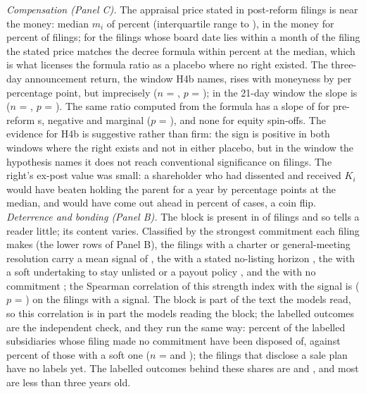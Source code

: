 \emph{Compensation (Panel C).} The appraisal price stated in post-reform filings is near the money: median $m_i$ of \MoneynessMedian{} percent (interquartile range \MoneynessQOne{} to \MoneynessQThree{}), in the money for \MoneynessITM{} percent of filings; for the \AppraisalProxyN{} filings whose board date lies within a month of the filing the stated price matches the decree formula within \AppraisalProxyDiff{} percent at the median, which is what licenses the formula ratio as a placebo where no right existed. The three-day announcement return, the window H4b names, rises with moneyness by \PutSlopeThree{} per percentage point, but imprecisely ($n$ = \PutSlopeThreeN{}, $p$ = \PutSlopeThreeP{}); in the 21-day window the slope is \PutSlopeTwentyOne{} ($n$ = \PutSlopeTwentyOneN{}, $p$ = \PutSlopeTwentyOneP{}). The same ratio computed from the formula has a slope of \PutPlaceboPre{} for pre-reform \captive{}s, negative and marginal ($p$ = \PutPlaceboPreP{}), and none for equity spin-offs. The evidence for H4b is suggestive rather than firm: the sign is positive in both windows where the right exists and not in either placebo, but in the window the hypothesis names it does not reach conventional significance on \PutSlopeThreeN{} filings. The right's ex-post value was small: a shareholder who had dissented and received $K_i$ would have beaten holding the parent for a year by \ExerciseMinusHold{} percentage points at the median, and would have come out ahead in \ExerciseBeats{} percent of cases, a coin flip. \emph{Deterrence and bonding (Panel B).} The block is present in \ProtPostWithBlock{} of \ProtPostN{} filings and so tells a reader little; its content varies. Classified by the strongest commitment each filing makes (the lower rows of Panel B), the \ProtStrengthNThree{} filings with a charter or general-meeting resolution carry a mean signal of \ProtStrengthMeanSThree{}, the \ProtStrengthNTwo{} with a stated no-listing horizon \ProtStrengthMeanSTwo{}, the \ProtStrengthNOne{} with a soft undertaking to stay unlisted or a payout policy \ProtStrengthMeanSOne{}, and the \ProtStrengthNZero{} with no commitment \ProtStrengthMeanSZero{}; the Spearman correlation of this strength index with the signal is \ProtStrengthRho{} ($p$ = \ProtStrengthP{}) on the \ProtStrengthN{} filings with a signal. The block is part of the text the models read, so this correlation is in part the models reading the block; the labelled outcomes are the independent check, and they run the same way: \ProtDisposedStrengthZero{} percent of the labelled subsidiaries whose filing made no commitment have been disposed of, against \ProtDisposedStrengthOne{} percent of those with a soft one ($n$ = \ProtNLabStrengthZero{} and \ProtNLabStrengthOne{}); the \ProtSalePlan{} filings that disclose a sale plan have no labels yet. The labelled outcomes behind these shares are \ProtNLabStrengthZero{} and \ProtNLabStrengthOne{}, and most are less than three years old.
